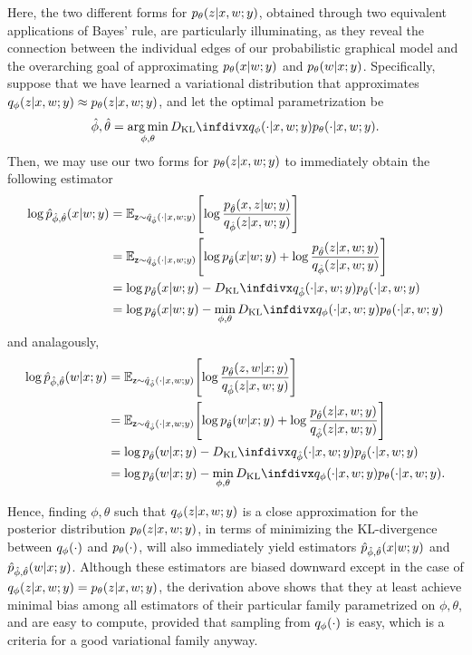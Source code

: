 Here, the two different forms for $\pld{z\given x,w;y}$, obtained through two equivalent applications of Bayes' rule, are particularly illuminating, as they reveal the connection between the individual edges of our probabilistic graphical model and the overarching goal of approximating $\pld{x\given w;y}$ and $\pld{w\given x;y}$. Specifically, suppose that we have learned a variational distribution that approximates $\qvd{z\given x,w;y}\approx \pld{z\given x,w;y}$, and let the optimal parametrization be
\[
    \hat\phi,\hat\theta = \argmin_{\phi,\theta} \DKL{\qvd{\cdot\given x,w;y}}{\pld{\cdot\given x,w;y}}.
\]
Then, we may use our two forms for $\pld{z\given x,w;y}$ to immediately obtain the following estimator
\begin{align}
    \log \pgdh{\hat\phi,\hat\theta}{x\given w;y} 
    &= \EX{\rz\sim\qgdh{\hat\phi}{\cdot\given x,w;y}}{\log\frac{\pgd{\hat\theta}{x,z\given w;y} }{\qgd{\hat\phi}{z\given x,w;y} } } \\
    &= \EX{\rz\sim\qgdh{\hat\phi}{\cdot\given x,w;y}}{\log\pgd{\hat\theta}{x\given w;y} + \log\frac{\pgd{\hat\theta}{z\given x,w;y} }{\qgd{\hat\phi}{z\given x,w;y} }} \\ 
    &= \log\pgd{\hat\theta}{x\given w;y} - \DKL{\qgd{\hat\phi}{\cdot\given x,w;y}}{\pgd{\hat\theta}{\cdot\given x,w;y}} \\ 
    &= \log\pgd{\hat\theta}{x\given w;y} - \min_{\phi,\theta} \DKL{\qgd{\phi}{\cdot\given x,w;y}}{\pgd{\theta}{\cdot\given x,w;y}}
\end{align}
and analagously,
\begin{align}
    \log \pgdh{\hat\phi,\hat\theta}{w\given x;y} 
    &= \EX{\rz\sim\qgdh{\hat\phi}{\cdot\given x,w;y}}{\log\frac{\pgd{\hat\theta}{z,w\given x;y} }{\qgd{\hat\phi}{z\given x,w;y} } } \\
    &= \EX{\rz\sim\qgdh{\hat\phi}{\cdot\given x,w;y}}{\log\pgd{\hat\theta}{w\given x;y} + \log\frac{\pgd{\hat\theta}{z\given x,w;y} }{\qgd{\hat\phi}{z\given x,w;y} }} \\ 
    &= \log\pgd{\hat\theta}{w\given x;y} - \DKL{\qgd{\hat\phi}{\cdot\given x,w;y}}{\pgd{\hat\theta}{\cdot\given x,w;y}} \\ 
    &= \log\pgd{\hat\theta}{w\given x;y} - \min_{\phi,\theta} \DKL{\qgd{\phi}{\cdot\given x,w;y}}{\pgd{\theta}{\cdot\given x,w;y}}.
\end{align}

Hence, finding $\phi,\theta$ such that $\qvd{z\given x,w;y}$ is a close approximation for the posterior distribution $\pld{z\given x,w;y}$, in terms of minimizing the KL-divergence between $\qvd{\cdot}$ and $\pld{\cdot}$, will also immediately yield estimators $ \pgdh{\hat\phi,\hat\theta}{x\given w;y} $ and $ \pgdh{\hat\phi,\hat\theta}{w\given x;y} $. Although these estimators are biased downward except in the case of $\qvd{z\given x,w;y}=\pld{z\given x,w;y}$, the derivation above shows that they at least achieve minimal bias among all estimators of their particular family parametrized on $\phi,\theta$, and are easy to compute, provided that sampling from $\qvd{\cdot}$ is easy, which is a criteria for a good variational family anyway.

